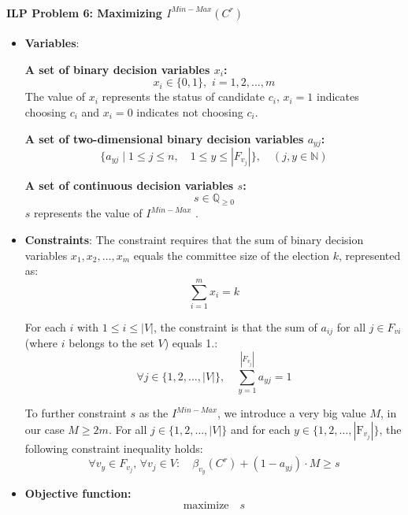 \documentclass{article}
\begin{document}
\paragraph*{ILP Problem 6: Maximizing  $I^{Min-Max}(C^{r})$}

\begin{itemize}

  \item \textbf{Variables}: 

\textbf{A set of binary decision variables $x_i$:} \[  x_i \in \{0, 1\} , \,\, i=1,2,\dots, m \] The value of $x_i$ represents the status of candidate $c_i$, \(x_i = 1\) indicates choosing $c_i$ and \(x_i = 0\) indicates not choosing $c_i$.


\textbf{A set of two-dimensional binary decision variables \( a_{yj} \):}
\[
\{ a_{yj} \mid 1 \leq j \leq n, \quad 1 \leq y \leq |F_{v_j}| \},  \quad (j, y \in \mathbb{N})
\]

\textbf{A set of continuous decision variables $s$:} 
\[  s\in \mathbb{Q}_{\geq 0} \] 
$s$ represents the value of $I^{Min-Max}$ .
    \item \textbf{Constraints}:
The constraint requires that the sum of binary decision variables \(x_1, x_2, \ldots, x_m\) equals the committee size of the election \(k\), represented as:
\begin{equation} \sum_{i=1}^m x_i = k  \label{eq:ilpminmax1}
\end{equation}

For each \(i\) with \(1 \leq i \leq |V|\), the constraint is that the sum of \( a_{ij} \) for all \( j \in F_{vi} \) (where \( i \) belongs to the set \( V \)) equals 1.:
\begin{equation} \forall j \in \{1, 2, \ldots, |V|\}, \quad \sum_{y=1}^{|F_{v_j}|} a_{yj} = 1  \label{eq:ilpminmax2}
\end{equation}

To further constraint $s$ as the $I^{Min-Max}$, we introduce a very big value $M$, in our case $M \geq  2m$. For all \( j \in \{1, 2, \ldots, |V|\} \) and for each  \( y \in \{1, 2, \ldots, |\text{F}_{v_j}|\} \), the following constraint inequality holds:
\begin{equation}  \forall v_y \in F_{v_j}, \,  \forall v_j \in V :\quad \beta_{v_y}(C^{r}) + (1 - a_{yj})\cdot M \geq s      \label{eq:ilpminmax3}
\end{equation}
  
  \item  \textbf{Objective function:}
  \[\text{maximize} \quad s \]


\end{itemize}
\end{document}
